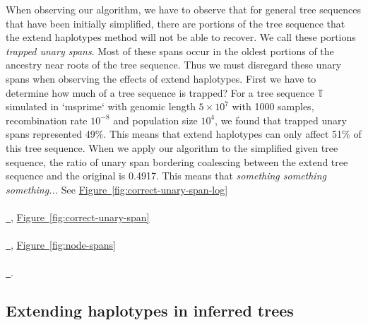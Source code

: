 \documentclass[10pt,twoside,lineno]{gsajnl}
\newcommand{\T}{\mathbb{T}}
\newcommand{\comment}[1]{{\color{violet} \it #1}}
\newcommand*{\figref}[2][]{%
	\hyperref[{#2}]{%
		Figure~\ref*{#2}%
		\ifx\\#1\\%
		\else
		\,#1%
		\fi
	}%
}
\begin{document}
When observing our algorithm, we have to observe that for general tree sequences that have been initially simplified, there are portions of the tree sequence that the extend haplotypes method will not be able to recover. We call these portions \textit{trapped unary spans}. Most of these spans occur in the oldest portions of the ancestry near roots of the tree sequence. Thus we must disregard these unary spans when observing the effects of extend haplotypes.
First we have to determine how much of a tree sequence is trapped?
For a tree sequence $\T$ simulated in `msprime` with genomic length $5\times 10^7$ with 1000 samples, recombination rate $10^{-8}$ and population size $10^4$, we found that trapped unary spans represented 49\%.
This means that extend haplotypes can only affect 51\% of this tree sequence.
When we apply our algorithm to the simplified given tree sequence, the ratio of unary span bordering coalescing between the extend tree sequence and the original is 0.4917. This means that \comment{something something something...}  
See \figref{fig:correct-unary-span-log}, \figref{fig:correct-unary-span}, \figref{fig:node-spans}.


%
%

\subsection{Extending haplotypes in inferred trees}
\end{document}
